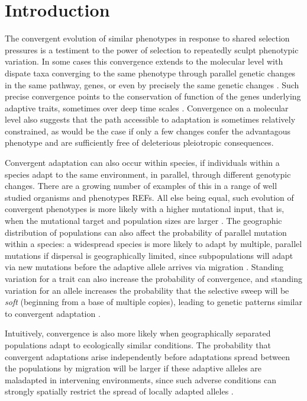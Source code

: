 \documentclass{article}
\begin{document}
\section{Introduction}

The convergent evolution of similar phenotypes in response to shared
selection pressures is a testiment to the power of selection to
repeatedly sculpt phenotypic variation. 
In some cases this convergence extends to the molecular level with
dispate taxa converging to the same phenotype through parallel genetic
changes in the same pathway, genes, 
or even by precisely the same genetic changes \citep{zhen2012parallel}. 
Such precise convergence points to the conservation of function of the genes
underlying adaptive traits, 
sometimes over deep time scales \citep{deephomologypapers}. 
Convergence on a molecular level also suggests that the path 
accessible to adaptation is sometimes relatively constrained, 
as would be the case if only a few changes confer the advantagous phenotype 
and are sufficiently free of deleterious pleiotropic consequences.


Convergent adaptation can also occur within species, if individuals within a species 
adapt to the same environment, in parallel, through different genotypic changes. 
There are a growing number of examples of this in a range of well studied organisms and phenotypes REFs.
All else being equal, such evolution of convergent phenotypes is more likely with a 
higher mutational input, that is, when the mutational target and population sizes are larger \citep{}. 
The geographic distribution of populations can also affect the probability of parallel mutation within a species:
a widespread species is more likely to adapt by multiple, parallel mutations if dispersal is geographically limited, 
since subpopulations will adapt via new mutations before the adaptive allele arrives via migration \citep{ralph2010parallel}. 
Standing variation for a trait can also increase the probability of convergence, 
and standing variation for an allele increases the probability that the selective sweep will be \emph{soft}
(beginning from a base of multiple copies),
leading to genetic patterns similar to convergent adaptation \citep{orr2001sieve,softsweepsI}. 

Intuitively, convergence is also more likely 
when geographically separated populations adapt to ecologically similar conditions. 
The probability that convergent adaptations arise independently
before adaptations spread between the populations by migration
will be larger if these adaptive alleles are maladapted in intervening environments,
since such adverse conditions can strongly spatially restrict the spread of locally adapted alleles \citep{slatkin1973geneflow}.
 
\end{document}

